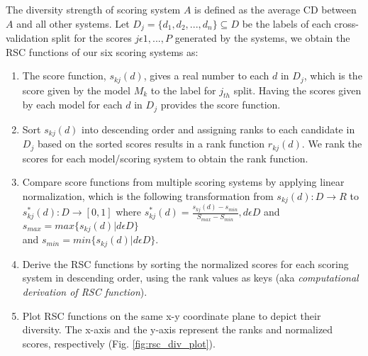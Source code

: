 The diversity strength of scoring system $A$ is defined as the average CD between $A$ and all other systems. Let $D_j = \{ d_1, d_2,...,d_n\} \subseteq D$ be the labels of each cross-validation split for the scores $j \epsilon 1, ..., P$ generated by the systems, we obtain the RSC functions of our six scoring systems as: 
\begin{enumerate}
    \item The score function, $s_{kj}(d)$, gives a real number to each $d$ in $D_j$, which is the score given by the model $M_k$ to the label for $j_{th}$ split. Having the scores given by each model for each $d$ in $D_j$ provides the score function. 
    \item Sort $s_{kj}(d)$ into descending order and assigning ranks to each candidate in $D_j$ based on the sorted scores results in a rank function $r_{kj}(d)$. We rank the scores for each model/scoring system to obtain the rank function. 
    \item Compare score functions from multiple scoring systems by applying linear normalization, which is the following transformation from $s_{kj}(d):D \rightarrow R$ to $s^*_{kj}(d):D\rightarrow[0,1]$ where $s^*_{kj}(d)=\frac{s_{kj}(d) - s_{min}}{S_{max}-S_{min}}, d \epsilon D$ and $s_{max}=max \{s_{kj}(d)|d \epsilon D\}$ \\ and $s_{min}=min \{s_{kj}(d)|d \epsilon D\}$.
    \item Derive the RSC functions by sorting the normalized scores for each scoring system in descending order, using the rank values as keys (aka \textit{computational derivation of RSC function}).
    \item Plot RSC functions on the same x-y coordinate plane to depict their diversity. The x-axis and the y-axis represent the ranks and normalized scores, respectively (Fig. \ref{fig:rsc_div_plot}).
\end{enumerate}



